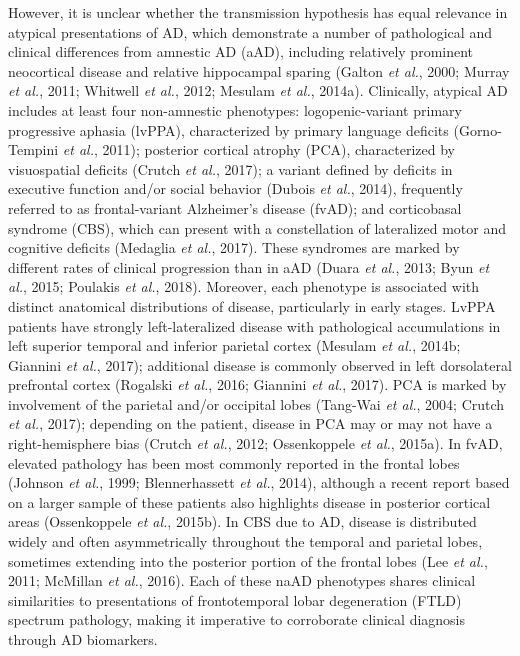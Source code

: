 \documentclass[]{article}
\begin{document}
However, it is unclear whether the transmission hypothesis has equal
relevance in atypical presentations of AD, which demonstrate a number of
pathological and clinical differences from amnestic AD (aAD), including
relatively prominent neocortical disease and relative hippocampal
sparing (Galton \emph{et al.}, 2000; Murray \emph{et al.}, 2011;
Whitwell \emph{et al.}, 2012; Mesulam \emph{et al.}, 2014a). Clinically,
atypical AD includes at least four non-amnestic phenotypes:
logopenic-variant primary progressive aphasia (lvPPA), characterized by
primary language deficits (Gorno-Tempini \emph{et al.}, 2011); posterior
cortical atrophy (PCA), characterized by visuospatial deficits (Crutch
\emph{et al.}, 2017); a variant defined by deficits in executive
function and/or social behavior (Dubois \emph{et al.}, 2014), frequently
referred to as frontal-variant Alzheimer's disease (fvAD); and
corticobasal syndrome (CBS), which can present with a constellation of
lateralized motor and cognitive deficits (Medaglia \emph{et al.}, 2017).
These syndromes are marked by different rates of clinical progression
than in aAD (Duara \emph{et al.}, 2013; Byun \emph{et al.}, 2015;
Poulakis \emph{et al.}, 2018). Moreover, each phenotype is associated
with distinct anatomical distributions of disease, particularly in early
stages. LvPPA patients have strongly left-lateralized disease with
pathological accumulations in left superior temporal and inferior
parietal cortex (Mesulam \emph{et al.}, 2014b; Giannini \emph{et al.},
2017); additional disease is commonly observed in left dorsolateral
prefrontal cortex (Rogalski \emph{et al.}, 2016; Giannini \emph{et al.},
2017). PCA is marked by involvement of the parietal and/or occipital
lobes (Tang-Wai \emph{et al.}, 2004; Crutch \emph{et al.}, 2017);
depending on the patient, disease in PCA may or may not have a
right-hemisphere bias (Crutch \emph{et al.}, 2012; Ossenkoppele \emph{et
al.}, 2015a). In fvAD, elevated pathology has been most commonly
reported in the frontal lobes (Johnson \emph{et al.}, 1999;
Blennerhassett \emph{et al.}, 2014), although a recent report based on a
larger sample of these patients also highlights disease in posterior
cortical areas (Ossenkoppele \emph{et al.}, 2015b). In CBS due to AD,
disease is distributed widely and often asymmetrically throughout the
temporal and parietal lobes, sometimes extending into the posterior
portion of the frontal lobes (Lee \emph{et al.}, 2011; McMillan \emph{et
al.}, 2016). Each of these naAD phenotypes shares clinical similarities
to presentations of frontotemporal lobar degeneration (FTLD) spectrum
pathology, making it imperative to corroborate clinical diagnosis
through AD biomarkers.
\end{document}

